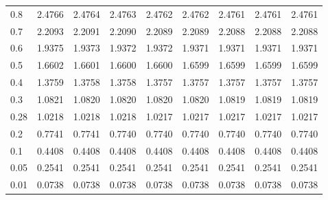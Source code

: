 \begin{landscape}
\begin{table}
\begin{center}
\begin{tabular}{l|rrrrrrrr}
0.8 & 2.4766 & 2.4764 & 2.4763 & 2.4762 & 2.4762 & 2.4761 & 2.4761 & 2.4761  \\ 
0.7 & 2.2093 & 2.2091 & 2.2090 & 2.2089 & 2.2089 & 2.2088 & 2.2088 & 2.2088  \\ 
0.6 & 1.9375 & 1.9373 & 1.9372 & 1.9372 & 1.9371 & 1.9371 & 1.9371 & 1.9371  \\ 
0.5 & 1.6602 & 1.6601 & 1.6600 & 1.6600 & 1.6599 & 1.6599 & 1.6599 & 1.6599  \\ 
0.4 & 1.3759 & 1.3758 & 1.3758 & 1.3757 & 1.3757 & 1.3757 & 1.3757 & 1.3757  \\ 
0.3 & 1.0821 & 1.0820 & 1.0820 & 1.0820 & 1.0820 & 1.0819 & 1.0819 & 1.0819  \\ 
0.28 & 1.0218 & 1.0218 & 1.0218 & 1.0217 & 1.0217 & 1.0217 & 1.0217 & 1.0217 \\ 
0.2 & 0.7741 & 0.7741 & 0.7740 & 0.7740 & 0.7740 & 0.7740 & 0.7740 & 0.7740  \\ 
0.1 & 0.4408 & 0.4408 & 0.4408 & 0.4408 & 0.4408 & 0.4408 & 0.4408 & 0.4408  \\ 
0.05 & 0.2541 & 0.2541 & 0.2541 & 0.2541 & 0.2541 & 0.2541 & 0.2541 & 0.2541 \\ 
0.01 & 0.0738 & 0.0738 & 0.0738 & 0.0738 & 0.0738 & 0.0738 & 0.0738 & 0.0738 \\ 
\hline \hline
\end{tabular}
\end{center}
\end{table}
\end{landscape}







